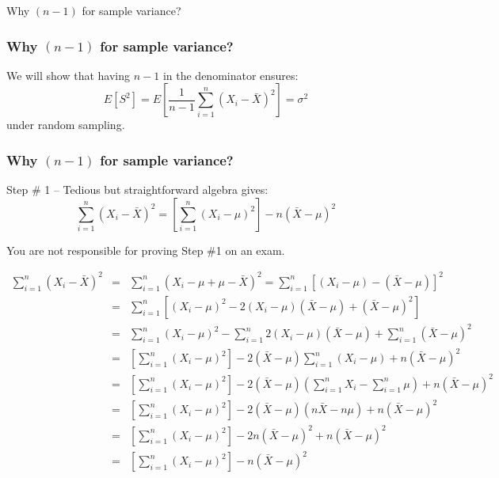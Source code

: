 \documentclass[handout]{beamer}
\begin{document}
\begin{frame}

\begin{center}
\huge Why $(n-1)$ for sample variance?
\end{center}

\end{frame}

\begin{frame}
\frametitle{Why $(n-1)$ for sample variance?}
\alert{We will show that having $n-1$ in the denominator ensures:}
$$E[S^2] =E\left[ \frac{1}{n-1} \sum_{i=1}^n \left(X_i - \bar{X}\right)^2\right] = \sigma^2$$
\alert{under random sampling.}
\end{frame}



\begin{frame}
\frametitle{Why $(n-1)$ for sample variance?}
\begin{block}{Step \# 1 -- Tedious but straightforward algebra gives:}
	$$\sum_{i=1}^n \left(X_i - \bar{X}\right)^2 = \left[  \sum_{i=1}^n \left(X_i - \mu\right)^2\right] - n(\bar{X}-\mu)^2$$
\end{block}
\alert{You are not responsible for proving Step \#1 on an exam.}

\end{frame}
\begin{frame}
\scriptsize
\begin{eqnarray*}
	\sum_{i=1}^n \left(X_i - \bar{X}\right)^2 &=& \sum_{i=1}^n \left(X_i - \mu + \mu - \bar{X}\right)^2 = \sum_{i=1}^n \left[(X_i -\mu) - (\bar{X} - \mu)\right]^2\\
		&=&\sum_{i=1}^n \left[(X_i -\mu)^2 - 2(X_i -\mu)(\bar{X} - \mu) + (\bar{X} - \mu)^2\right]\\
		&=&\sum_{i=1}^n (X_i -\mu)^2 - \sum_{i=1}^n 2(X_i -\mu)(\bar{X} - \mu) + \sum_{i=1}^n (\bar{X} - \mu)^2\\
		&=& \left[  \sum_{i=1}^n \left(X_i - \mu\right)^2\right]   - 2(\bar{X} - \mu) \sum_{i=1}^n (X_i -\mu)+n(\bar{X} - \mu)^2\\
				&=& \left[  \sum_{i=1}^n \left(X_i - \mu\right)^2\right]   - 2(\bar{X} - \mu) \left( \sum_{i=1}^n X_i- \sum_{i=1}^n \mu \right)+n(\bar{X} - \mu)^2\\
				&=& \left[  \sum_{i=1}^n \left(X_i - \mu\right)^2\right]   - 2(\bar{X} - \mu)(n\bar{X}-n\mu)+n(\bar{X} - \mu)^2\\
				&=&\left[  \sum_{i=1}^n \left(X_i - \mu\right)^2\right]   - 2n(\bar{X} - \mu)^2+n(\bar{X} - \mu)^2\\
				&=&\left[  \sum_{i=1}^n \left(X_i - \mu\right)^2\right]   - n(\bar{X} - \mu)^2
\end{eqnarray*}
\end{frame}
\end{document}
